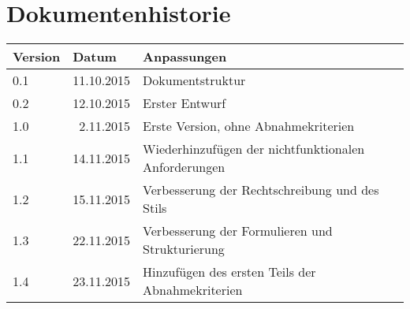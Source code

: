 \section*{Dokumentenhistorie}
\begin{tabularx}{\linewidth}{|l|r|X|} \hline
Version & \multicolumn{1}{l|}{Datum} 			& Anpassungen \\ \hline
0.1 & 11.10.2015 & Dokumentstruktur \\ \hline
0.2	& 12.10.2015 & Erster Entwurf  \\ \hline
1.0 &  2.11.2015 & Erste Version, ohne Abnahmekriterien \\ \hline
1.1 & 14.11.2015 & Wiederhinzufügen der nichtfunktionalen Anforderungen \\ \hline
1.2 & 15.11.2015 & Verbesserung der Rechtschreibung und des Stils \\ \hline
1.3 & 22.11.2015 & Verbesserung der Formulieren und Strukturierung\\ \hline
1.4 & 23.11.2015 & Hinzufügen des ersten Teils der Abnahmekriterien\\ \hline
\end{tabularx}
